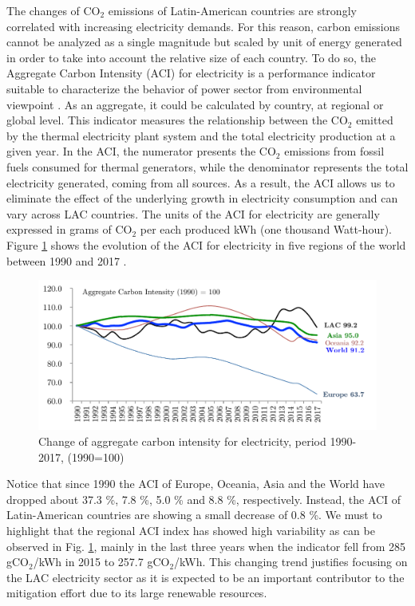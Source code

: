 \documentclass[energies,article,accept,moreauthors,12pt,a4paper]{mdpi} %
\begin{document}
The changes of CO$_2$ emissions of Latin-American countries are strongly correlated with increasing electricity demands. For this reason, carbon emissions cannot be analyzed as a single magnitude but scaled by unit of energy generated in order to take into account the relative size of each country. To do so, the Aggregate Carbon Intensity (ACI) for electricity is a performance indicator suitable to characterize the behavior of power sector from environmental viewpoint \cite{ang2016}.  As an aggregate, it could be calculated by country, at regional or global level. This indicator measures the relationship between the CO$_2$ emitted by the thermal electricity plant system and the total electricity production at a given year. In the ACI, the numerator
presents the CO$_2$ emissions from fossil fuels consumed
for thermal generators, while the denominator
represents the total electricity generated, coming
from all sources. As a result, the ACI allows us to eliminate the effect of the underlying growth in electricity
consumption and can vary across LAC countries. The units of the ACI for electricity are generally expressed in grams of CO$_2$ per each produced kWh (one thousand Watt-hour). Figure \ref{globACI} shows the evolution of the ACI for electricity in five regions of the world between 1990 and 2017 \cite{IEAEnergyCombution2019}. 


\begin{figure}[ht] \centerline{
     \includegraphics[width=13cm]{images/globACI.pdf}}
       \caption{Change of aggregate carbon intensity for electricity, period 1990-2017, (1990=100) \cite{IEAEnergyCombution2019}}
      \label{globACI}
        \end{figure}

Notice that since 1990 the ACI of Europe, Oceania, Asia and the World have dropped about 37.3 \%, 7.8 \%, 5.0 \%  and 8.8 \%, respectively.  Instead, the ACI of Latin-American countries are showing a small decrease of 0.8 \%. We must to highlight that the regional ACI index has showed high variability as can be observed in Fig.  \ref{globACI}, mainly in the last three years when the indicator fell from 285 gCO$_2$/kWh in 2015 to 257.7 gCO$_2$/kWh. This changing trend justifies focusing on the LAC electricity sector as it is expected to be an important contributor to the mitigation effort due to its large renewable resources.
\end{document}
